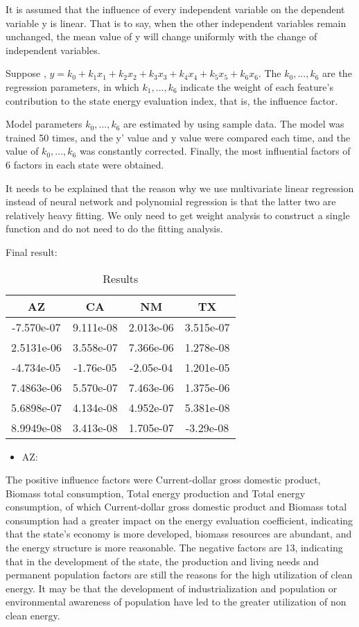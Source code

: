 \documentclass[a4paper]{article}
\begin{document}
It is assumed that the influence of every independent variable on the dependent variable y is linear. That is to say, when the other independent variables remain unchanged, the mean value of y will change uniformly with the change of independent variables.

Suppose , $y=k_0 + k_1 x_1 + k_2 x_2 + k_3 x_3 + k_4 x_4 + k_5 x_5 + k_6 x_6.$ The $k_0,...,k_6$ are the regression parameters, in which $k_1,...,k_6$ indicate the weight of each feature's contribution to the state energy evaluation index, that is, the influence factor.

Model parameters $k_0,...,k_6$ are estimated by using sample data. The model was trained 50 times, and the y' value and y value were compared each time, and the value of $k_0,...,k_6$ was constantly corrected. Finally, the most influential factors of 6 factors in each state were obtained.

It needs to be explained that the reason why we use multivariate linear regression instead of neural network and polynomial regression is that the latter two are relatively heavy fitting. We only need to get weight analysis to construct a single function and do not need to do the fitting analysis.

Final result:

\begin{table}[!htbp]
\centering
\begin{tabular}{cccc}
\toprule
AZ & CA & NM & TX\\
\midrule
-7.570e-07 & 9.111e-08 & 2.013e-06 & 3.515e-07\\
2.5131e-06 & 3.558e-07 & 7.366e-06 & 1.278e-08\\
-4.734e-05 & -1.76e-05 & -2.05e-04 & 1.201e-05\\
7.4863e-06 & 5.570e-07 & 7.463e-06 & 1.375e-06\\
5.6898e-07 & 4.134e-08 & 4.952e-07 & 5.381e-08\\
8.9949e-08 & 3.413e-08 & 1.705e-07 & -3.29e-08\\
\bottomrule
\end{tabular}
\caption{Results}\label{tab:aStrangeTable}
\end{table}

\begin{itemize}
\item AZ:
\end{itemize}

The positive influence factors were Current-dollar gross domestic product, Biomass total consumption, Total energy production and Total energy consumption, of which Current-dollar gross domestic product and Biomass total consumption had a greater impact on the energy evaluation coefficient, indicating that the state's economy is more developed, biomass resources are abundant, and the energy structure is more reasonable. The negative factors are 13, indicating  that in the development of the state, the production and living needs and permanent population factors are still the reasons for the high utilization of clean energy. It may be that the development of industrialization and population or environmental awareness of population have led to the greater utilization of non clean energy.
\end{document}
